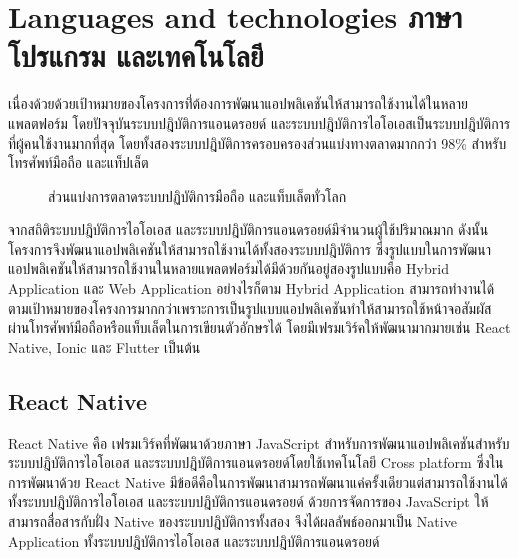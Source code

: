 \documentclass[12pt,oneside,openright,a4paper]{cpe-thai-project}
\begin{document}
\newpage
\section{Languages and technologies ภาษาโปรแกรม และเทคโนโลยี}
เนื่องด้วยด้วยเป้าหมายของโครงการที่่ต้องการพัฒนาแอปพลิเคชันให้สามารถใช้งานได้ในหลายแพลตฟอร์ม 
โดยปัจจุบันระบบปฎิบัติการแอนดรอยด์ และระบบปฎิบัติการไอโอเอสเป็นระบบปฎิบัติการที่ผู้คนใช้งานมากที่สุด 
โดยทั้งสองระบบปฎิบัติการครอบครองส่วนแบ่งทางตลาดมากกว่า 98\%  สำหรับโทรศัพท์มือถือ และแท็ปเล็ต
\begin{figure}[H]\centering
  \setlength{\fboxrule}{0.2mm} %
  \setlength{\fboxsep}{1cm}
  \caption{ส่วนแบ่งการตลาดระบบปฏิบัติการมือถือ และแท็บเล็ตทั่วโลก}\label{fig:market}
\end{figure}
จากสถิติระบบปฎิบัติการไอโอเอส และระบบปฎิบัติการแอนดรอยด์มีจำนวนผู้ใช้ปริมาณมาก ดังนั้นโครงการจึงพัฒนาแอปพลิเคชันให้สามารถใช้งานได้ทั้งสองระบบปฎิบัติการ 
ซึ่งรูปแบบในการพัฒนาแอปพลิเคชันให้สามารถใช้งานในหลายแพลตฟอร์มได้มีด้วยกันอยู่สองรูปแบบคือ Hybrid Application และ Web Application อย่างไรก็ตาม Hybrid Application 
สามารถทำงานได้ตามเป้าหมายของโครงการมากกว่าเพราะการเป็นรูปแบบแอปพลิเคชันทำให้สามารถใช้หน้าจอสัมผัสผ่านโทรศัพท์มือถือหรือแท็บเล็ตในการเขียนตัวอักษรได้ โดยมีเฟรมเวิร์คให้พัฒนามากมายเช่น React Native, Ionic และ Flutter เป็นต้น


\subsection{React Native}
React Native คือ เฟรมเวิร์คที่พัฒนาด้วยภาษา JavaScript สำหรับการพัฒนาแอปพลิเคชันสำหรับระบบปฎิบัติการไอโอเอส และระบบปฎิบัติการแอนดรอยด์โดยใช้เทคโนโลยี 
Cross platform ซึ่งในการพัฒนาด้วย React Native มีข้อดีคือในการพัฒนาสามารถพัฒนาแค่ครั้งเดียวแต่สามารถใช้งานได้ทั้งระบบปฎิบัติการไอโอเอส และระบบปฎิบัติการแอนดรอยด์ 
ด้วยการจัดการของ JavaScript ให้สามารถสื่อสารกับฝั่ง Native ของระบบปฎิบัติการทั้งสอง จึงได้ผลลัพธ์ออกมาเป็น Native Application ทั้งระบบปฎิบัติการไอโอเอส และระบบปฎิบัติการแอนดรอยด์ 
\end{document}
